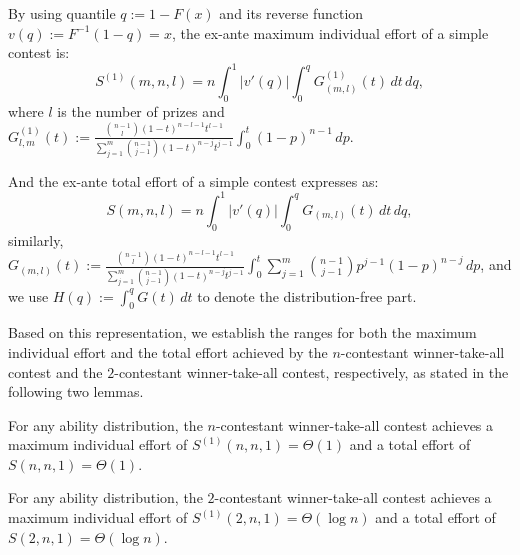 \begin{lemma}\label{lem:QuantileRep}
    By using quantile $q:=1-F(x)$ and its reverse function $v(q):=F^{-1}(1-q)=x$, the ex-ante maximum individual effort of a simple contest is:
    \[
    S^{(1)}(m,n, l)= n\int_0^1|v'(q)|\int_0^qG^{(1)}_{(m,l)}(t)\,dt\,dq,
    \]
    where $l$ is the number of prizes and $G_{l,m}^{(1)}(t):=\frac{\binom{n-1}{l}(1-t)^{n-l-1}t^{l-1}}{\sum_{j=1}^{m}\binom{n-1}{j-1}(1-t)^{n-j}t^{j-1}}\int_{0}^{t}(1-p)^{n-1}\,dp.$
    
    And the ex-ante total effort of a simple contest expresses as:
    \[
    S(m,n, l)= n\int_0^1|v'(q)|\int_0^qG_{(m,l)}(t)\,dt\,dq,
    \]similarly, $G_{(m,l)}(t):=\frac{\binom{n-1}{l}(1-t)^{n-l-1}t^{l-1}}{\sum_{j=1}^{m}\binom{n-1}{j-1}(1-t)^{n-j}t^{j-1}}\int_{0}^{t}\sum_{j=1}^{m}\binom{n-1}{j-1}p^{j-1}(1-p)^{n-j}\,dp$, and we use $H(q):=\int_0^qG(t)\,dt$ to denote the distribution-free part.  
\end{lemma}

Based on this representation, we establish the ranges for both the maximum individual effort and the total effort achieved by the $n$-contestant winner-take-all contest and the $2$-contestant winner-take-all contest, respectively, as stated in the following two lemmas.

\begin{lemma}\label{lem:bound on n,1}
    For any ability distribution, the $n$-contestant winner-take-all contest achieves a maximum individual effort of $S^{(1)}(n, n,1) = \Theta(1)$ and a total effort of $S(n, n,1) = \Theta(1)$.
\end{lemma}
    
\begin{lemma}\label{lem:bound on 2,1}
    For any ability distribution, the $2$-contestant winner-take-all contest achieves a maximum individual effort of $S^{(1)}(2, n,1) = \Theta(\log n)$ and a total effort of $S(2, n,1) = \Theta(\log n)$.
\end{lemma}

